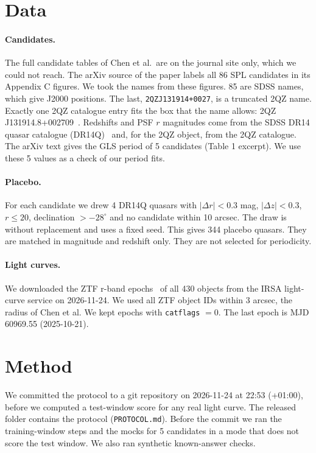 \documentclass[11pt]{article}
\begin{document}
\section{Data}
\paragraph{Candidates.} The full candidate tables of Chen et al.\ are on the journal site only, which we could not reach. The arXiv source of the paper labels all 86 SPL candidates in its Appendix C figures. We took the names from these figures. 85 are SDSS names, which give J2000 positions. The last, \texttt{2QZJ131914+0027}, is a truncated 2QZ name. Exactly one 2QZ catalogue entry fits the box that the name allows: 2QZ J131914.8+002709~\cite{croom2004}. Redshifts and PSF $r$ magnitudes come from the SDSS DR14 quasar catalogue (DR14Q)~\cite{paris2018} and, for the 2QZ object, from the 2QZ catalogue. The arXiv text gives the GLS period of 5 candidates (Table 1 excerpt). We use these 5 values as a check of our period fits.

\paragraph{Placebo.} For each candidate we drew 4 DR14Q quasars with $|\Delta r|<0.3$ mag, $|\Delta z|<0.3$, $r\le 20$, declination $>-28^\circ$ and no candidate within 10 arcsec. The draw is without replacement and uses a fixed seed. This gives 344 placebo quasars. They are matched in magnitude and redshift only. They are not selected for periodicity.

\paragraph{Light curves.} We downloaded the ZTF r-band epochs~\cite{bellm2019,masci2019} of all 430 objects from the IRSA light-curve service on 2026-11-24. We used all ZTF object IDs within 3 arcsec, the radius of Chen et al. We kept epochs with \texttt{catflags} $=0$. The last epoch is MJD 60969.55 (2025-10-21).

\section{Method}
We committed the protocol to a git repository on 2026-11-24 at 22:53 (+01:00), before we computed a test-window score for any real light curve. The released folder contains the protocol (\texttt{PROTOCOL.md}). Before the commit we ran the training-window steps and the mocks for 5 candidates in a mode that does not score the test window. We also ran synthetic known-answer checks.
\end{document}
